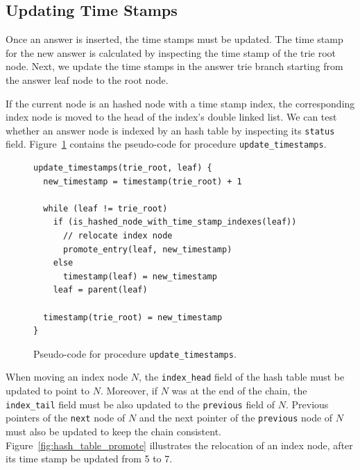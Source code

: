 \subsection{Updating Time Stamps}

Once an answer is inserted, the time stamps must be updated.
The time stamp for the new answer is calculated by inspecting the time stamp of the trie root node.
Next, we update the time stamps in the answer trie branch starting from the answer leaf node to the
root node.

If the current node is an hashed node with a time stamp index, the corresponding index node is moved to the head of
the index's double linked list. We can test whether an answer node is indexed by
an hash table by inspecting its \texttt{status} field.
Figure~\ref{fig:update_timestamps} contains the pseudo-code for procedure \texttt{update\_timestamps}.

\begin{figure}[ht]
\begin{Verbatim}
update_timestamps(trie_root, leaf) {
  new_timestamp = timestamp(trie_root) + 1
  
  while (leaf != trie_root)
    if (is_hashed_node_with_time_stamp_indexes(leaf))
      // relocate index node
      promote_entry(leaf, new_timestamp)
    else
      timestamp(leaf) = new_timestamp
    leaf = parent(leaf)
      
  timestamp(trie_root) = new_timestamp
}
\end{Verbatim}
\caption{Pseudo-code for procedure \texttt{update\_timestamps}.}
\label{fig:update_timestamps}
\end{figure}

When moving an index node $N$, the \texttt{index\_head} field of the hash table must be updated
to point to $N$. Moreover, if $N$ was at the end of the chain,
the \texttt{index\_tail} field must be also updated to the \texttt{previous} field of $N$.
Previous pointers of the \texttt{next} node of $N$ and the next pointer of
the \texttt{previous} node of $N$ must
also be updated to keep the chain consistent.
Figure~\ref{fig:hash_table_promote} illustrates the relocation of an index node, after
its time stamp be updated from 5 to 7.

